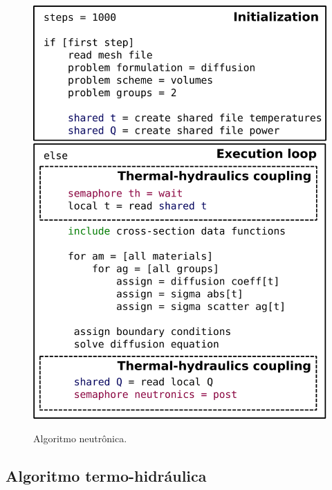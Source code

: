 \begin{figure}[htb]
  \caption{Algoritmo neutrônica.}
  \centering\includegraphics[scale=0.5]{figuras/algoritmos_milonga.png}
  \label{algo_neutronica}
\end{figure}

\subsection{Algoritmo termo-hidráulica}
\label{subsec:th}

